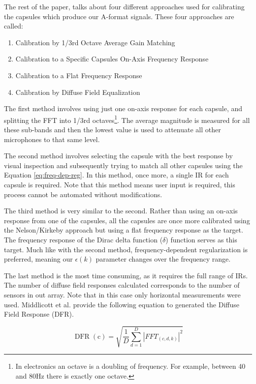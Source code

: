 The rest of the paper, talks about four different approaches used for calibrating the capsules which produce our A-format signals. These four approaches are called:

\begin{enumerate}
    \item Calibration by 1/3rd Octave Average Gain Matching
    \item Calibration to a Specific Capsules On-Axis Frequency Response
    \item Calibration to a Flat Frequency Response
    \item Calibration by Diffuse Field Equalization
\end{enumerate}

The first method involves using just one on-axis response for each capsule, and splitting the FFT into 1/3rd octaves\footnote{In electronics an octave is a doubling of frequency. For example, between 40 and 80Hz there is exactly one octave.}. The average magnitude is measured for all these sub-bands and then the lowest value is used to attenuate all other microphones to that same level. 

The second method involves selecting the capsule with the best response by visual inspection and subsequently trying to match all other capsules using the Equation \ref{eq:freq-dep-reg}. In this method, once more, a single IR for each capsule is required. Note that this method means user input is required, this process cannot be automated without modifications.

The third method is very similar to the second. Rather than using an on-axis response from one of the capsules, all the capsules are once more calibrated using the Nelson/Kirkeby approach but using a flat frequency response as the target. The frequency response of the Dirac delta function ($\delta$) function serves as this target. Much like with the second method, frequency-dependent regularization is preferred, meaning our $\epsilon(k)$ parameter changes over the frequency range. 

The last method is the most time consuming, as it requires the full range of IRs. The number of diffuse field responses calculated corresponds to the number of sensors in out array. Note that in this case only horizontal measurements were used. Middlicott et al. provide the following equation to generated the Diffuse Field Response (DFR).

\begin{equation}
\operatorname{DFR}(\mathrm{c})=\sqrt{\frac{1}{D} \sum_{d=1}^{D}\left|F F T_{(c, d, k)}\right|^{2}}
\end{equation}

